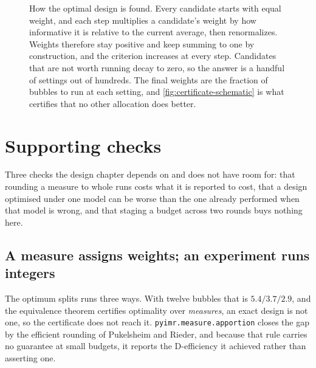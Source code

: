 \documentclass[10pt]{article}
\begin{document}
\begin{figure}[t]
\centering
{}
\caption{How the optimal design is found. Every candidate starts with equal weight, and each
step multiplies a candidate's weight by how informative it is relative to the current average,
then renormalizes. Weights therefore stay positive and keep summing to one by construction, and
the criterion increases at every step. Candidates that are not worth running decay to zero, so
the answer is a handful of settings out of hundreds. The final weights are the fraction of
bubbles to run at each setting, and \cref{fig:certificate-schematic} is what certifies that no
other allocation does better.}
\label{fig:multiplicative}
\end{figure}


\section{Supporting checks}
\label{sec:supporting}

Three checks the design chapter depends on and does not have room for: that rounding a measure
to whole runs costs what it is reported to cost, that a design optimised under one model can be
worse than the one already performed when that model is wrong, and that staging a budget across
two rounds buys nothing here.

\subsection*{A measure assigns weights; an experiment runs integers}

The optimum splits runs three ways. With twelve bubbles that is $5.4/3.7/2.9$, and the
equivalence theorem certifies optimality over \emph{measures}, an exact design is not one,
so the certificate does not reach it. \texttt{pyimr.measure.apportion} closes the gap by the
efficient rounding of Pukelsheim and Rieder, and because that rule carries no guarantee at
small budgets, it reports the D-efficiency it achieved rather than asserting one.
\end{document}

